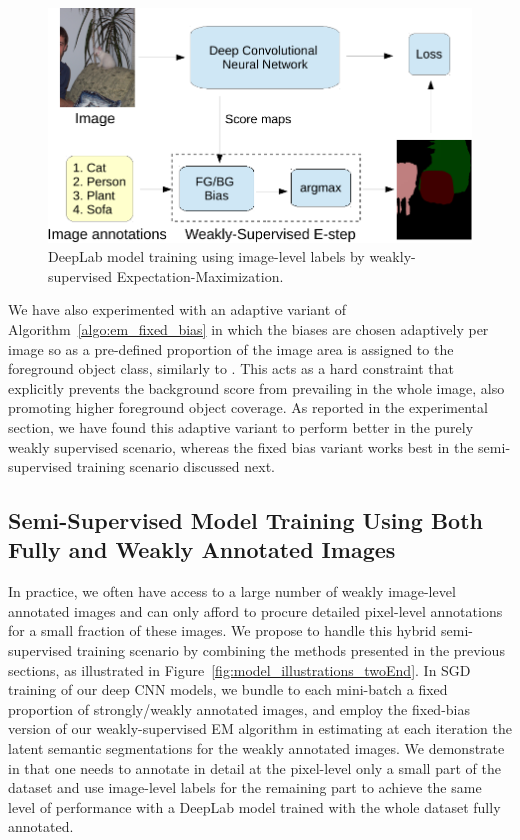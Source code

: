 \begin{figure}[htbp!]
  \centering
  \includegraphics[width=0.9\linewidth]{fig/model_train_image.pdf} 
  \caption{DeepLab model training using image-level labels by
    weakly-supervised Expectation-Maximization.}
  \label{fig:model_train_image}
\end{figure}

We have also experimented with an adaptive variant of
Algorithm~\ref{algo:em_fixed_bias} in which the biases are chosen
adaptively per image so as a pre-defined proportion of the image area
is assigned to the foreground object class, similarly to
\citet{kuck2005individuals}. This acts as a hard constraint that
explicitly prevents the background score from prevailing in the whole
image, also promoting higher foreground object coverage. As reported
in the experimental section, we have found this adaptive variant to
perform better in the purely weakly supervised scenario, whereas the
fixed bias variant works best in the semi-supervised training scenario
discussed next.

\subsection{Semi-Supervised Model Training Using Both Fully and Weakly Annotated Images}
\label{sec:train_semi}

In practice, we often have access to a large number of weakly
image-level annotated images and can only afford to procure detailed
pixel-level annotations for a small fraction of these images. We
propose to handle this hybrid semi-supervised training scenario by
combining the methods presented in the previous sections, as
illustrated in Figure~\ref{fig:model_illustrations_twoEnd}. In SGD
training of our deep CNN models, we bundle to each mini-batch a fixed
proportion of strongly/weakly annotated images, and employ the
fixed-bias version of our weakly-supervised EM algorithm in estimating
at each iteration the latent semantic segmentations for the weakly
annotated images. We demonstrate in  that one
needs to annotate in detail at the pixel-level only a small part of
the dataset and use image-level labels for the remaining part to
achieve the same level of performance with a DeepLab model trained
with the whole dataset fully annotated.

